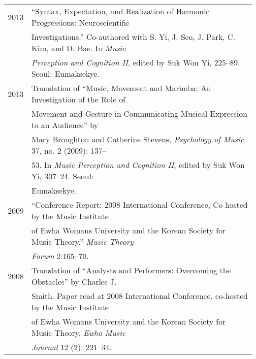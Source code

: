 \documentclass[a4,11pt,draft]{article}
\begin{document}
  \hspace*{-0.25cm}
  \begin{tabular}{p{2.5cm} p{12.5cm}}
%    
    2013 & “Syntax, Expectation, and Realization of Harmonic Progressions: Neuroscientific\\
    & Investigations.” Co-authored with S. Yi, J. Seo, J. Park, C. Kim, and D. Bae. In \textit{Music} \\
    & \textit{Perception and Cognition II}, edited by Suk Won Yi, 225–89. Seoul: Eumaksekye.\\[2mm]

    2013 & Translation of “Music, Movement and Marimba: An Investigation of the Role of\\
    & Movement and Gesture in Communicating Musical Expression to an Audience” by\\
    & Mary Broughton and Catherine Stevens, \textit{Psychology of Music} 37, no. 2 (2009): 137–\\
    & 53. In \textit{Music Perception and Cognition II}, edited by Suk Won Yi, 307–24. Seoul:\\
    & Eumaksekye.\\[2mm]
    
    2009 & “Conference Report: 2008 International Conference, Co-hosted by the Music Institute\\
    & of Ewha Womans University and the Korean Society for Music Theory.” \textit{Music Theory}\\
    & \textit{Forum} 2:165–70.\\[2mm]
    
    2008 & Translation of “Analysts and Performers: Overcoming the Obstacles” by Charles J.\\
    & Smith. Paper read at 2008 International Conference, co-hosted by the Music Institute\\
    & of Ewha Womans University and the Korean Society for Music Theory. \textit{Ewha Music}\\
    & \textit{Journal} 12 (2): 221–34.
  \end{tabular}
  
  \vspace{2.5mm}
  
\end{document}
